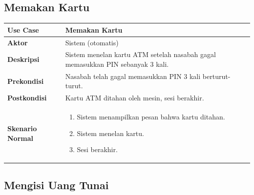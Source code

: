 \documentclass[conference,10pt]{IEEEtran}
\begin{document}
\subsection{Memakan Kartu}

\begin{center}
\begin{tabular}{|L{2.3cm}|L{5cm}|}
\hline
\textbf{Use Case} & Memakan Kartu \\
\hline
\textbf{Aktor} & Sistem (otomatis) \\
\hline
\textbf{Deskripsi} & Sistem menelan kartu ATM setelah nasabah gagal memasukkan PIN sebanyak 3 kali. \\
\hline
\textbf{Prekondisi} & Nasabah telah gagal memasukkan PIN 3 kali berturut-turut. \\
\hline
\textbf{Postkondisi} & Kartu ATM ditahan oleh mesin, sesi berakhir. \\
\hline
\textbf{Skenario Normal} &
\begin{enumerate}
\setlength\itemsep{0pt}
\item Sistem menampilkan pesan bahwa kartu ditahan.
\item Sistem menelan kartu.
\item Sesi berakhir.
\end{enumerate} \\
\hline
\end{tabular}
\end{center}

\subsection{Mengisi Uang Tunai}
\end{document}
